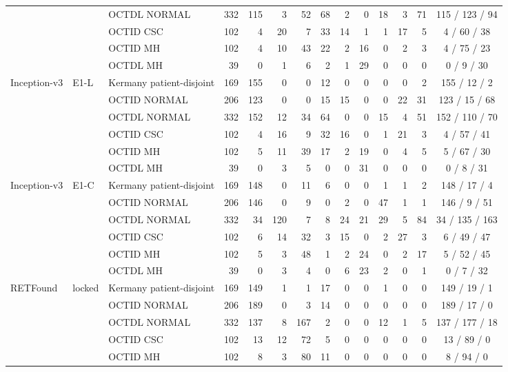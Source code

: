 \begin{longtable}{@{}lll rrrrrrrrrrc@{}}
 &  & OCTDL NORMAL & 332 & 115 & 3 & 52 & 68 & 2 & 0 & 18 & 3 & 71 & 115 / 123 / 94 \\
 &  & OCTID CSC & 102 & 4 & 20 & 7 & 33 & 14 & 1 & 1 & 17 & 5 & 4 / 60 / 38 \\
 &  & OCTID MH & 102 & 4 & 10 & 43 & 22 & 2 & 16 & 0 & 2 & 3 & 4 / 75 / 23 \\
 &  & OCTDL MH & 39 & 0 & 1 & 6 & 2 & 1 & 29 & 0 & 0 & 0 & 0 / 9 / 30 \\
\addlinespace[1pt]
Inception-v3 & E1-L & Kermany patient-disjoint & 169 & 155 & 0 & 0 & 12 & 0 & 0 & 0 & 0 & 2 & 155 / 12 / 2 \\
 &  & OCTID NORMAL & 206 & 123 & 0 & 0 & 15 & 15 & 0 & 0 & 22 & 31 & 123 / 15 / 68 \\
 &  & OCTDL NORMAL & 332 & 152 & 12 & 34 & 64 & 0 & 0 & 15 & 4 & 51 & 152 / 110 / 70 \\
 &  & OCTID CSC & 102 & 4 & 16 & 9 & 32 & 16 & 0 & 1 & 21 & 3 & 4 / 57 / 41 \\
 &  & OCTID MH & 102 & 5 & 11 & 39 & 17 & 2 & 19 & 0 & 4 & 5 & 5 / 67 / 30 \\
 &  & OCTDL MH & 39 & 0 & 3 & 5 & 0 & 0 & 31 & 0 & 0 & 0 & 0 / 8 / 31 \\
\addlinespace[1pt]
Inception-v3 & E1-C & Kermany patient-disjoint & 169 & 148 & 0 & 11 & 6 & 0 & 0 & 1 & 1 & 2 & 148 / 17 / 4 \\
 &  & OCTID NORMAL & 206 & 146 & 0 & 9 & 0 & 2 & 0 & 47 & 1 & 1 & 146 / 9 / 51 \\
 &  & OCTDL NORMAL & 332 & 34 & 120 & 7 & 8 & 24 & 21 & 29 & 5 & 84 & 34 / 135 / 163 \\
 &  & OCTID CSC & 102 & 6 & 14 & 32 & 3 & 15 & 0 & 2 & 27 & 3 & 6 / 49 / 47 \\
 &  & OCTID MH & 102 & 5 & 3 & 48 & 1 & 2 & 24 & 0 & 2 & 17 & 5 / 52 / 45 \\
 &  & OCTDL MH & 39 & 0 & 3 & 4 & 0 & 6 & 23 & 2 & 0 & 1 & 0 / 7 / 32 \\
\addlinespace[1pt]
RETFound & locked & Kermany patient-disjoint & 169 & 149 & 1 & 1 & 17 & 0 & 0 & 1 & 0 & 0 & 149 / 19 / 1 \\
 &  & OCTID NORMAL & 206 & 189 & 0 & 3 & 14 & 0 & 0 & 0 & 0 & 0 & 189 / 17 / 0 \\
 &  & OCTDL NORMAL & 332 & 137 & 8 & 167 & 2 & 0 & 0 & 12 & 1 & 5 & 137 / 177 / 18 \\
 &  & OCTID CSC & 102 & 13 & 12 & 72 & 5 & 0 & 0 & 0 & 0 & 0 & 13 / 89 / 0 \\
 &  & OCTID MH & 102 & 8 & 3 & 80 & 11 & 0 & 0 & 0 & 0 & 0 & 8 / 94 / 0 \\

\end{longtable}
